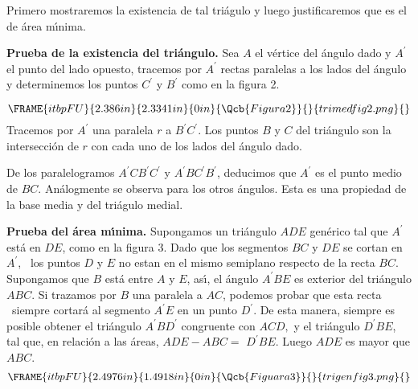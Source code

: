 \documentclass[a4paper,spanish]{article}
\begin{document}
Primero mostraremos la existencia de tal tri\'{a}gulo y luego justificaremos
que es el de \'{a}rea m\'{\i}nima.

\textbf{Prueba de la existencia del tri\'{a}ngulo. }Sea $A$ el v\'{e}rtice
del \'{a}ngulo dado y $A^{\prime }$ el punto del lado opuesto, tracemos por $%
A^{\prime }$ rectas paralelas a los lados del \'{a}ngulo y determinemos los
puntos $C^{\prime }$ y $B^{\prime }$ como en la figura 2.

\[
\FRAME{itbpFU}{2.386in}{2.3341in}{0in}{\Qcb{Figura 2}}{}{trimedfig2.png}{%
\special{language "Scientific Word";type "GRAPHIC";display
"USEDEF";valid_file "F";width 2.386in;height 2.3341in;depth
0in;original-width 2.9516in;original-height 3.1488in;cropleft "0";croptop
"0.9811";cropright "0.9613";cropbottom "0";filename
'F:/Optimizacion/TriMedFig2.PNG';file-properties "XNPEU";}} 
\]%
Tracemos por $A^{\prime }$ una paralela $r$ a $B^{\prime }C^{\prime }$. Los
puntos $B$ y $C$ del tri\'{a}ngulo son la intersecci\'{o}n de $r$ con cada
uno de los lados del \'{a}ngulo dado.

De los paralelogramos $A^{\prime }CB^{\prime }C^{\prime }$ y $A^{\prime
}BC^{\prime }B^{\prime }$, deducimos que $A^{\prime }$ es el punto medio de $%
BC$. An\'{a}logmente se observa para los otros \'{a}ngulos. Esta es una
propiedad de la base media y del tri\'{a}gulo medial.

\textbf{Prueba del \'{a}rea m\'{\i}nima. }Supongamos un tri\'{a}ngulo $ADE$
gen\'{e}rico tal que $A^{\prime }$ est\'{a} en $DE$, como en la figura 3.
Dado que los segmentos $BC$ y $DE$ se cortan en $A^{\prime }$, \ los puntos $%
D$ y $E$ no estan en el mismo semiplano respecto de la recta $BC$.
Supongamos que $B$ est\'{a} entre $A$ y $E$, as\'{\i}, el \'{a}ngulo $%
A^{\prime }BE$ es exterior del tri\'{a}ngulo $ABC$. Si trazamos por $B$ una
paralela a $AC$, podemos probar que esta recta \ siempre cortar\'{a} al
segmento $A^{\prime }E$ en un punto $D^{\prime }$. De esta manera, siempre
es posible obtener el tri\'{a}ngulo $A^{\prime }BD^{\prime }$ congruente con 
$ACD,$ y el tri\'{a}ngulo $D^{\prime }BE$, tal que, en relaci\'{o}n a las 
\'{a}reas, $ADE-ABC=$ $D^{\prime }BE$. Luego $ADE$ es mayor que $ABC$.%
\[
\FRAME{itbpFU}{2.4976in}{1.4918in}{0in}{\Qcb{Figuara 3}}{}{trigenfig3.png}{%
\special{language "Scientific Word";type "GRAPHIC";maintain-aspect-ratio
TRUE;display "USEDEF";valid_file "F";width 2.4976in;height 1.4918in;depth
0in;original-width 2.4569in;original-height 1.4563in;cropleft "0";croptop
"1";cropright "1";cropbottom "0";filename
'F:/Optimizacion/TriGenFig3.png';file-properties "XNPEU";}} 
\]
\end{document}
